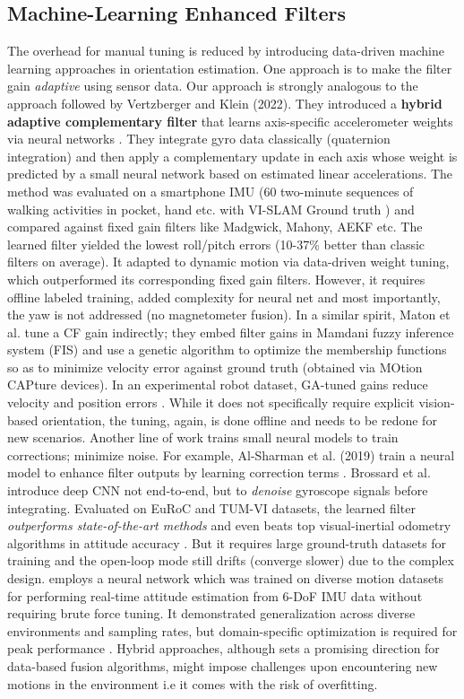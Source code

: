 \documentclass{iutbscthesis}
\begin{document}
\subsection{Machine-Learning Enhanced Filters}
The overhead for manual tuning is reduced by introducing data-driven machine learning approaches in orientation estimation. One approach is to make the filter gain \textit{adaptive} using sensor data. Our approach is strongly analogous to the approach followed by Vertzberger and Klein (2022). They introduced a \textbf{hybrid adaptive complementary filter} that learns axis-specific accelerometer weights via neural networks \cite{vertzberger2022adaptive}. They integrate gyro data classically (quaternion integration) and then apply a complementary update in each axis whose weight is predicted by a small neural network based on estimated linear accelerations. The method was evaluated on a smartphone IMU (60 two-minute sequences of walking activities in pocket, hand etc. with VI-SLAM Ground truth \cite{vertzberger2022adaptive}) and compared against fixed gain filters like Madgwick, Mahony, AEKF etc. The learned filter yielded the lowest roll/pitch errors (10-37\% better than classic filters on average). It adapted to dynamic motion via data-driven weight tuning, which outperformed its corresponding fixed gain filters. However, it requires offline labeled training, added complexity for neural net and most importantly, the yaw is not addressed (no magnetometer fusion). In a similar spirit, Maton et al. tune a CF gain  indirectly; they embed filter gains in Mamdani fuzzy inference system (FIS) and use a genetic algorithm to optimize the membership functions so as to minimize velocity error against ground truth (obtained via MOtion CAPture devices). In an experimental robot dataset, GA-tuned gains reduce velocity and position errors \cite{maton2024indirectgainGA}. While it does not specifically require explicit vision-based orientation, the tuning, again, is done offline and needs to be redone for new scenarios. 
Another line of work trains small neural models to train corrections; minimize noise. For example, Al-Sharman et al. (2019) train a neural model to enhance filter outputs by learning correction terms \cite{sharman2019dlcorrection}. Brossard et al. introduce deep CNN not end-to-end, but to \textit{denoise} gyroscope signals before integrating. Evaluated on EuRoC and TUM-VI datasets, the learned filter \textit{outperforms state-of-the-art methods} and even beats top visual-inertial odometry algorithms in attitude accuracy \cite{denoising}. But it requires large ground-truth datasets for training and the open-loop mode still drifts (converge slower) due to the complex design. \cite{weber2020RIANN} employs a neural network which was trained on diverse motion datasets for performing real-time attitude estimation from 6-DoF IMU data without requiring brute force tuning. It demonstrated generalization across diverse environments and sampling rates, but domain-specific optimization is required for peak performance \cite{weber2020RIANN}. Hybrid approaches, although sets a promising direction for data-based fusion algorithms, might impose challenges upon encountering new motions in the environment i.e it comes with the risk of overfitting.  
\end{document}
